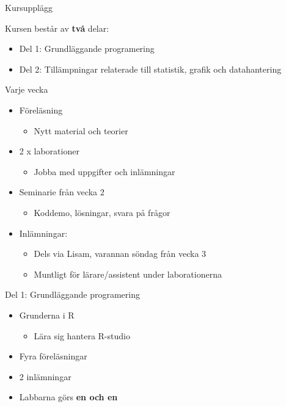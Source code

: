 \documentclass[
  10pt,
  ignorenonframetext,
]{beamer}
\providecommand{\tightlist}{%
  \setlength{\itemsep}{0pt}\setlength{\parskip}{0pt}}
\begin{document}
\begin{frame}{Kursupplägg}
\protect\hypertarget{kursuppluxe4gg}{}
\begin{block}{Kursen består av \textbf{två} delar:}
\protect\hypertarget{kursen-bestuxe5r-av-tvuxe5-delar}{}
\begin{itemize}
\tightlist
\item
  Del 1: Grundläggande programering
\item
  Del 2: Tillämpningar relaterade till statistik, grafik och
  datahantering
\end{itemize}

\pause
\end{block}

\begin{block}{Varje vecka}
\protect\hypertarget{varje-vecka}{}
\begin{itemize}
\tightlist
\item
  Föreläsning

  \begin{itemize}
  \tightlist
  \item
    Nytt material och teorier
  \end{itemize}
\item
  2 x laborationer

  \begin{itemize}
  \tightlist
  \item
    Jobba med uppgifter och inlämningar
  \end{itemize}
\item
  Seminarie från vecka 2

  \begin{itemize}
  \tightlist
  \item
    Koddemo, lösningar, svara på frågor
  \end{itemize}
\item
  Inlämningar:

  \begin{itemize}
  \tightlist
  \item
    Dels via Lisam, varannan söndag från vecka 3
  \item
    Muntligt för lärare/assistent under laborationerna
  \end{itemize}
\end{itemize}
\end{block}
\end{frame}

\begin{frame}{Del 1: Grundläggande programering}
\protect\hypertarget{del-1-grundluxe4ggande-programering}{}
\begin{itemize}
\tightlist
\item
  Grunderna i R

  \begin{itemize}
  \tightlist
  \item
    Lära sig hantera R-studio
  \end{itemize}
\item
  Fyra föreläsningar
\item
  2 inlämningar
\item
  Labbarna görs \textbf{en och en}
\end{itemize}
\end{frame}
\end{document}
